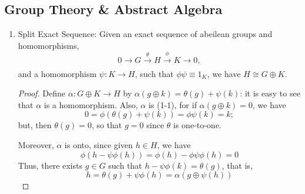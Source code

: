\documentclass{book}
\begin{document}
\subsection{Group Theory \& Abstract Algebra}
\begin{enumerate}[(1)]
    \item Split Exact Sequence: \label{sec:splitexact}
        Given an exact sequence of abeilean groups and homomorphisms, 
        \[0 \xrightarrow[]{} G \xrightarrow{\theta} H \xrightarrow{\phi} K \xrightarrow[]{} 0, \]
        and a homomorphism $\psi: K \rightarrow H$, such that $\phi\psi \equiv 1_K$, we have $H \cong G \oplus K$. 
        \begin{proof}
            Define $\alpha: G \oplus K \rightarrow H$ by $\alpha(g \oplus k) = \theta(g) + \psi(k)$: it is easy to see that $\alpha$ is a homomorphism. Also, $\alpha$ is (1-1), for if $\alpha(g \oplus k) = 0$, we have 
            \[0 = \phi(\theta(g) + \psi(k)) = \phi\psi(k) = k;\]
            but, then $\theta(g) = 0$, so that $g = 0$ since $\theta$ is one-to-one. 
            \par Moreover, $\alpha$ is onto, since given $h \in H$, we have 
            \[\phi(h - \psi\phi(h)) = \phi(h) - \phi\psi\phi(h) = 0\]
            Thus, there exists $g \in G$ such that $h - \psi\phi(k) = \theta(g)$, that is, 
            \[h = \theta(g) + \psi\phi(h) = \alpha(g \oplus \psi(h))\]
        \end{proof}
\end{enumerate}
\end{document}
